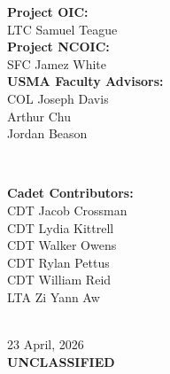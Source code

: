 \begin{titlepage}
\begin{minipage}{0.4\textwidth}
\begin{flushleft} \large
\textbf{Project OIC:}\\
LTC Samuel Teague \\
\textbf{Project NCOIC:} \\
SFC Jamez White\\
\textbf{USMA Faculty Advisors:}\\
COL Joseph Davis \\
Arthur Chu \\
Jordan Beason
\end{flushleft}
\end{minipage}
~
\begin{minipage}{0.4\textwidth}
\begin{flushright} \large
\textbf{Cadet Contributors:} \\
CDT Jacob Crossman\\
CDT Lydia Kittrell\\
CDT Walker Owens\\
CDT Rylan Pettus\\
CDT William Reid\\
LTA Zi Yann Aw
\end{flushright}
\end{minipage}\\[2cm]



{\vspace*{\fill}\large 23 April, 2026 \\\large\textbf{UNCLASSIFIED}}


\vfill %

\end{titlepage}